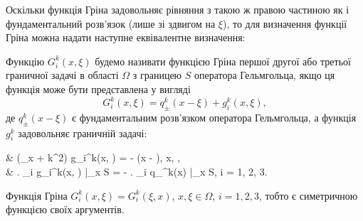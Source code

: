 Оскільки функція Гріна задовольняє рівняння з такою ж правою частиною як і фундаментальний розв'язок (лише зі здвигом на $\xi$), то для визначення функції Гріна можна надати  наступне еквівалентне визначення:
\begin{definition}
	Функцію $G_i^k(x, \xi)$ будемо називати функцією Гріна першої другої або третьої граничної задачі в області $\Omega$ з границею $S$ оператора Гельмгольца, якщо ця функція  може бути представлена у вигляді
	\begin{equation}
		G_i^k(x, \xi) = q_\pm^k(x - \xi) + g_i^k(x, \xi),
	\end{equation}
	де $q_\pm^k(x - \xi)$ є фундаментальним розв'язком оператора Гельмгольца, а функція $g_i^k$ задовольняє граничній задачі: 
	\begin{system}
		& (\Delta_x + k^2) g_i^k(x, \xi) = - \delta(x - \xi), \quad x, \xi \in \Omega, \\
		& \left. \ell_i g_i^k(x, \xi) \right|_{x \in S} = - \left. \ell_i q_\pm^k(x) \right|_{x \in S}, \quad i = 1, 2, 3.
	\end{system}
\end{definition}

\begin{proposition}
	Функція Гріна $G_i^k(x, \xi) = G_i^k(\xi, x)$, $x, \xi \in \Omega$, $i = 1, 2, 3$, тобто є симетричною функцією своїх аргументів.
\end{proposition}

